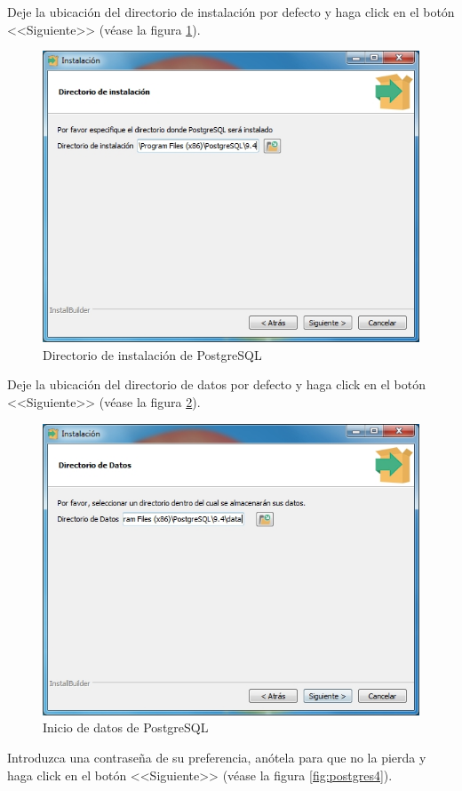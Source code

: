 Deje la ubicaci\'{o}n del directorio de instalaci\'{o}n por defecto y haga click en el bot\'{o}n <<Siguiente>> (v\'{e}ase la figura \ref{fig:postgres2}).

\begin{figure}[H]
  \centering
  \includegraphics[width=.6\linewidth]{./img/postgres2.jpg}
\caption[Directorio de instalaci\'{o}n de PostgreSQL]{Directorio de instalaci\'{o}n de PostgreSQL\label{fig:postgres2}}
\end{figure}

\newpage

Deje la ubicaci\'{o}n del directorio de datos por defecto y haga click en el bot\'{o}n <<Siguiente>> (v\'{e}ase la figura \ref{fig:postgres3}).

\begin{figure}[H]
  \centering
  \includegraphics[width=.6\linewidth]{./img/postgres3.jpg}
\caption[Inicio de datos de PostgreSQL]{Inicio de datos de PostgreSQL\label{fig:postgres3}}
\end{figure}

Introduzca una contrase\~{n}a de su preferencia, an\'{o}tela para que no la pierda y haga click en el bot\'{o}n <<Siguiente>> (v\'{e}ase la figura \ref{fig:postgres4}).

